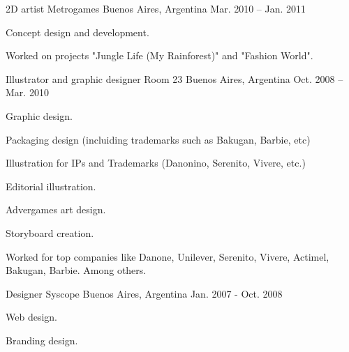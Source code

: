 \begin{cventries}
  \cventry
    {2D artist} %
    {Metrogames} %
    {Buenos Aires, Argentina} %
    {Mar. 2010 – Jan. 2011} %
    {
      \begin{cvitems} %
        \item {Concept design and development.}
        \item {Worked on projects "Jungle Life (My Rainforest)" and "Fashion World".}
      \end{cvitems}
    }
  \cventry
    {Illustrator and graphic designer} %
    {Room 23} %
    {Buenos Aires, Argentina} %
    {Oct. 2008 – Mar. 2010} %
    {
      \begin{cvitems} %
        \item {Graphic design.}
        \item {Packaging design (incluiding trademarks such as Bakugan, Barbie, etc)}
        \item {Illustration for IPs and Trademarks (Danonino, Serenito, Vivere, etc.)}
        \item {Editorial illustration.}
        \item {Advergames art design.}
        \item {Storyboard creation.}
        \item {Worked for top companies like Danone, Unilever, Serenito, Vivere, Actimel, Bakugan, Barbie. Among others.}
      \end{cvitems}
    }
  \cventry
    {Designer} %
    {Syscope} %
    {Buenos Aires, Argentina} %
    {Jan. 2007 - Oct. 2008} %
    {
      \begin{cvitems} %
        \item {Web design.}
        \item {Branding design.}
      \end{cvitems}
    }
\end{cventries}
